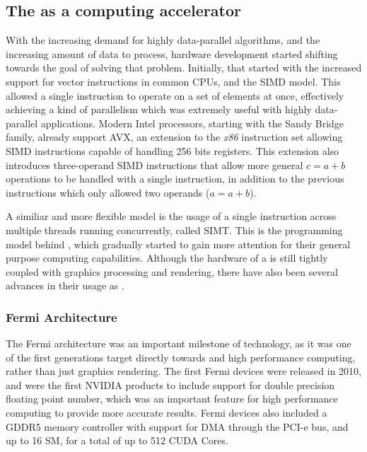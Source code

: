 \documentclass[main.tex]{subfiles}
\begin{document}
\subsection{The \gpu as a computing accelerator}

With the increasing demand for highly data-parallel algorithms, and the increasing amount of data to process, hardware development started shifting towards the goal of solving that problem. Initially, that started with the increased support for vector instructions in common \acsp{CPU}, and the \acs{SIMD} model. This allowed a single instruction to operate on a set of elements at once, effectively achieving a kind of parallelism which was extremely useful with highly data-parallel applications. Modern Intel processors, starting with the Sandy Bridge family, already support \ac{AVX}, an extension to the \textit{x86} instruction set allowing \acs{SIMD} instructions capable of handling 256 bits registers. This extension also introduces three-operand \acs{SIMD} instructions that allow more general $c = a + b$ operations to be handled with a single instruction, in addition to the previous instructions which only allowed two operands ($a = a + b$).

A similiar and more flexible model is the usage of a single instruction across multiple threads running concurrently, called \ac{SIMT}. This is the programming model behind \gpus, which gradually started to gain more attention for their general purpose computing capabilities. Although the hardware of a \gpus is still tightly coupled with graphics processing and rendering, there have also been several advances in their usage as \gpgpus.


\subsubsection{Fermi Architecture}

The Fermi architecture was an important milestone of \gpus technology, as it was one of the first generations target directly towards \gpgpu and high performance computing, rather than just graphics rendering. The first Fermi devices were released in 2010, and were the first NVIDIA products to include support for double precision floating point number, which was an important feature for high performance computing to provide more accurate results. Fermi devices also included a GDDR5 memory controller with support for \ac{DMA} through the \acs{PCI-e} bus, and up to 16 \acf{SM}, for a total of up to 512 \acs{CUDA} Cores.
\end{document}
